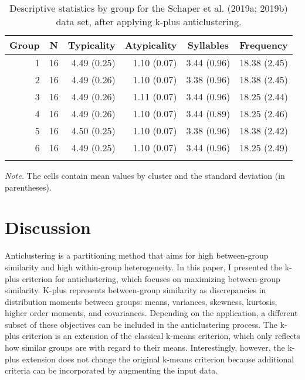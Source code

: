 \documentclass[
  man,floatsintext]{apa7}
\begin{document}
\begin{table}[tbp]

\begin{center}
\begin{threeparttable}

\caption{\label{tab:unnamed-chunk-6}Descriptive statistics by group for the Schaper et al. (2019a; 2019b) data set, after applying k-plus anticlustering.}

\begin{tabular}{rrrrrr}
\toprule
Group & \multicolumn{1}{c}{N} & \multicolumn{1}{c}{Typicality} & \multicolumn{1}{c}{Atypicality} & \multicolumn{1}{c}{Syllables} & \multicolumn{1}{c}{Frequency}\\
\midrule
1 & 16 & 4.49 (0.25) & 1.10 (0.07) & 3.44 (0.96) & 18.38 (2.45)\\
2 & 16 & 4.49 (0.26) & 1.10 (0.07) & 3.38 (0.96) & 18.38 (2.45)\\
3 & 16 & 4.49 (0.26) & 1.11 (0.07) & 3.44 (0.96) & 18.25 (2.44)\\
4 & 16 & 4.49 (0.26) & 1.10 (0.07) & 3.44 (0.89) & 18.25 (2.46)\\
5 & 16 & 4.50 (0.25) & 1.10 (0.07) & 3.38 (0.96) & 18.38 (2.42)\\
6 & 16 & 4.49 (0.25) & 1.10 (0.07) & 3.44 (0.96) & 18.25 (2.49)\\
\bottomrule
\addlinespace
\end{tabular}

\begin{tablenotes}[para]
\normalsize{\textit{Note.} The cells contain mean values by cluster and the standard deviation (in parentheses).}
\end{tablenotes}

\end{threeparttable}
\end{center}

\end{table}

\hypertarget{discussion}{%
\section{Discussion}\label{discussion}}

Anticlustering is a partitioning method that aims for high between-group similarity and high within-group heterogeneity. In this paper, I presented the k-plus criterion for anticlustering, which focuses on maximizing between-group similarity. K-plus represents between-group similarity as discrepancies in distribution moments between groups: means, variances, skewness, kurtosis, higher order moments, and covariances. Depending on the application, a different subset of these objectives can be included in the anticlustering process. The k-plus criterion is an extension of the classical k-means criterion, which only reflects how similar groups are with regard to their means. Interestingly, however, the k-plus extension does not change the original k-means criterion because additional criteria can be incorporated by augmenting the input data.
\end{document}

